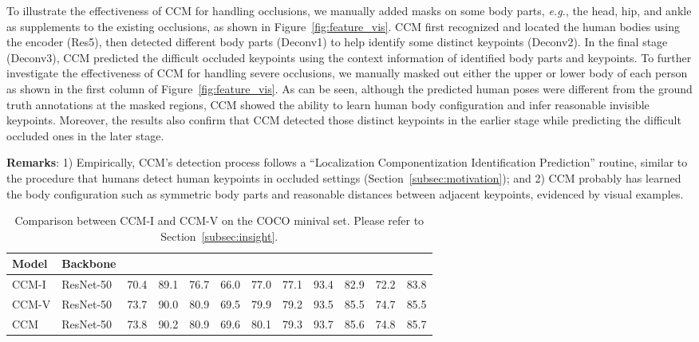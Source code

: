 \documentclass[twocolumn]{svjour3}          \smartqed  \usepackage{natbib}
\begin{document}
To illustrate the effectiveness of CCM for handling occlusions, we manually added masks on some body parts, \emph{e.g.}, the head, hip, and ankle as supplements to the existing occlusions, as shown in Figure~\ref{fig:feature_vis}. CCM first recognized and located the human bodies using the encoder (Res5), then detected different body parts (Deconv1) to help identify some distinct keypoints (Deconv2). In the final stage (Deconv3), CCM predicted the difficult occluded keypoints using the context information of identified body parts and keypoints. To further investigate the effectiveness of CCM for handling severe occlusions, we manually masked out either the upper or lower body of each person as shown in the first column of Figure~\ref{fig:feature_vis}. As can be seen, although the predicted human poses were different from the ground truth annotations at the masked regions, CCM showed the ability to learn human body configuration and infer reasonable invisible keypoints. Moreover, the results also confirm that CCM detected those distinct keypoints in the earlier stage while predicting the difficult occluded ones in the later stage.

\textbf{Remarks}: 1) Empirically, CCM's detection process follows a ``Localization  Componentization  Identification  Prediction'' routine, similar to the procedure that humans detect human keypoints in occluded settings (Section~\ref{subsec:motivation}); and 2) CCM probably has learned the body configuration such as symmetric body parts and reasonable distances between adjacent keypoints, evidenced by visual examples.

\begin{table*}[htbp]
  \centering
  \small
  \caption{Comparison between CCM-I and CCM-V on the COCO minival set. Please refer to Section~\ref{subsec:insight}.}
    \begin{tabular}{llllllllllll}
    \toprule
      Model  & Backbone   &     &   &  &  &  &   &   &  &  &  \\
    \midrule
    CCM-I & ResNet-50 & 70.4  & 89.1  & 76.7  & 66.0  & 77.0  & 77.1  & 93.4  & 82.9  & 72.2  & 83.8 \\
    CCM-V & ResNet-50 & 73.7  & 90.0  & 80.9  & 69.5  & 79.9  & 79.2  & 93.5  & 85.5  & 74.7  & 85.5 \\
    CCM & ResNet-50 & 73.8  & 90.2  & 80.9  & 69.6  & 80.1  & 79.3  & 93.7  & 85.6  & 74.8  & 85.7 \\
    \bottomrule
    \end{tabular}\label{tab:main_results}\end{table*}
\end{document}
